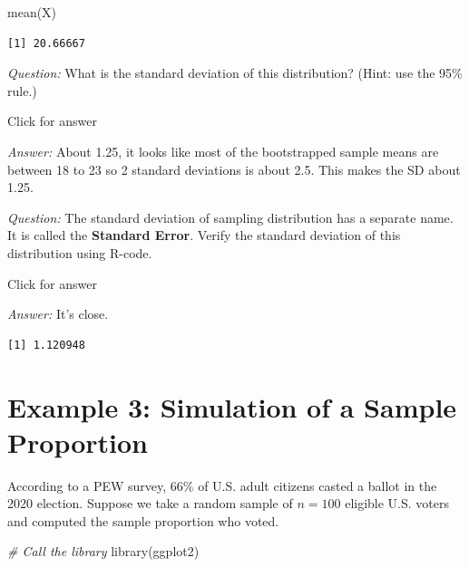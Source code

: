 \documentclass[
]{book}
\newenvironment{Shaded}{\begin{snugshade}}{\end{snugshade}}
\newcommand{\CommentTok}[1]{\textcolor[rgb]{0.56,0.35,0.01}{\textit{#1}}}
\newcommand{\FunctionTok}[1]{\textcolor[rgb]{0.00,0.00,0.00}{#1}}
\newcommand{\NormalTok}[1]{#1}
\newcommand{\SpecialCharTok}[1]{\textcolor[rgb]{0.00,0.00,0.00}{#1}}
\begin{document}
\begin{Shaded}
\begin{Highlighting}[]
\FunctionTok{mean}\NormalTok{(X)}
\end{Highlighting}
\end{Shaded}

\begin{verbatim}
[1] 20.66667
\end{verbatim}

\emph{Question:} What is the standard deviation of this distribution? (Hint: use the 95\% rule.)

Click for answer

\emph{Answer:} About 1.25, it looks like most of the bootstrapped sample means are between 18 to 23 so 2 standard deviations is about 2.5. This makes the SD about 1.25.

\emph{Question:} The standard deviation of sampling distribution has a separate name. It is called the \textbf{Standard Error}. Verify the standard deviation of this distribution using R-code.

Click for answer

\emph{Answer:} It's close.

\begin{Shaded}
\end{Shaded}

\begin{verbatim}
[1] 1.120948
\end{verbatim}

\hypertarget{example-3-simulation-of-a-sample-proportion}{%
\section{Example 3: Simulation of a Sample Proportion}\label{example-3-simulation-of-a-sample-proportion}}

According to a PEW survey, \(66\%\) of U.S. adult citizens casted a ballot in the 2020 election. Suppose we take a random sample of \(n=100\) eligible U.S. voters and computed the sample proportion who voted.

\begin{Shaded}
\begin{Highlighting}[]
\CommentTok{\# Call the library}
\FunctionTok{library}\NormalTok{(ggplot2)}
\end{Highlighting}
\end{Shaded}
\end{document}
